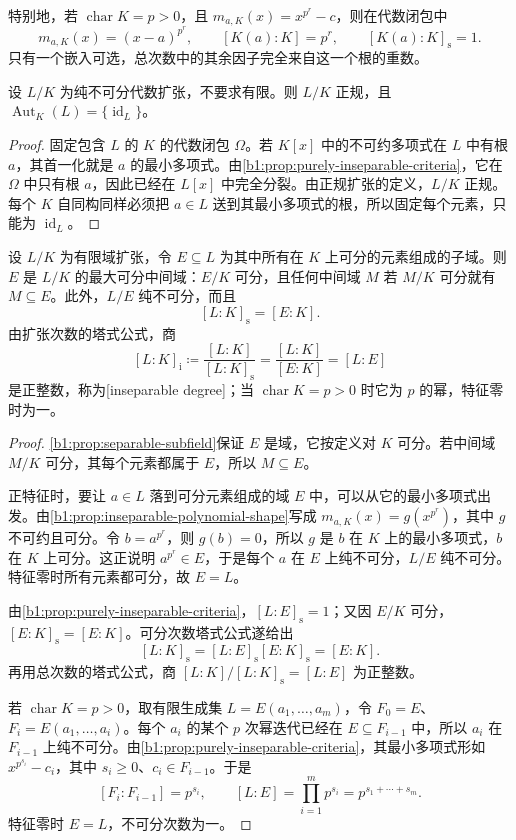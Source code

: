特别地，若 \(\operatorname{char}K=p>0\)，且 \(m_{a,K}(x)=x^{p^r}-c\)，则在代数闭包中
\[
	m_{a,K}(x)=(x-a)^{p^r},\qquad [K(a):K]=p^r,\qquad [K(a):K]_{\mathrm s}=1.
\]
只有一个嵌入可选，总次数中的其余因子完全来自这一个根的重数。

\begin{corollary}\label{b1:cor:purely-inseparable-normal}
	设 \(L/K\) 为纯不可分代数扩张，不要求有限。则 \(L/K\) 正规，且 \(\operatorname{Aut}_K(L)=\{\operatorname{id}_L\}\)。
\end{corollary}
\begin{proof}
	固定包含 \(L\) 的 \(K\) 的代数闭包 \(\Omega\)。若 \(K[x]\) 中的不可约多项式在 \(L\) 中有根 \(a\)，其首一化就是 \(a\) 的最小多项式。由\cref{b1:prop:purely-inseparable-criteria}，它在 \(\Omega\) 中只有根 \(a\)，因此已经在 \(L[x]\) 中完全分裂。由正规扩张的定义，\(L/K\) 正规。每个 \(K\) 自同构同样必须把 \(a\in L\) 送到其最小多项式的根，所以固定每个元素，只能为 \(\operatorname{id}_L\)。
\end{proof}

\begin{proposition}\label{b1:prop:separable-inseparable-decomposition}
	设 \(L/K\) 为有限域扩张，令 \(E\subseteq L\) 为其中所有在 \(K\) 上可分的元素组成的子域。则 \(E\) 是 \(L/K\) 的最大可分中间域：\(E/K\) 可分，且任何中间域 \(M\) 若 \(M/K\) 可分就有 \(M\subseteq E\)。此外，\(L/E\) 纯不可分，而且
	\[
		[L:K]_{\mathrm s}=[E:K].
	\]
	由扩张次数的塔式公式，商
	\[
		[L:K]_{\mathrm i}\coloneqq\frac{[L:K]}{[L:K]_{\mathrm s}} =\frac{[L:K]}{[E:K]}=[L:E]
	\]
	是正整数，称为[inseparable degree]；当 \(\operatorname{char}K=p>0\) 时它为 \(p\) 的幂，特征零时为一。
\end{proposition}
\begin{proof}
	\cref{b1:prop:separable-subfield}保证 \(E\) 是域，它按定义对 \(K\) 可分。若中间域 \(M/K\) 可分，其每个元素都属于 \(E\)，所以 \(M\subseteq E\)。

	正特征时，要让 \(a\in L\) 落到可分元素组成的域 \(E\) 中，可以从它的最小多项式出发。由\cref{b1:prop:inseparable-polynomial-shape}写成 \(m_{a,K}(x)=g(x^{p^r})\)，其中 \(g\) 不可约且可分。令 \(b=a^{p^r}\)，则 \(g(b)=0\)，所以 \(g\) 是 \(b\) 在 \(K\) 上的最小多项式，\(b\) 在 \(K\) 上可分。这正说明 \(a^{p^r}\in E\)，于是每个 \(a\) 在 \(E\) 上纯不可分，\(L/E\) 纯不可分。特征零时所有元素都可分，故 \(E=L\)。

	由\cref{b1:prop:purely-inseparable-criteria}，\([L:E]_{\mathrm s}=1\)；又因 \(E/K\) 可分，\([E:K]_{\mathrm s}=[E:K]\)。可分次数塔式公式遂给出
	\[
		[L:K]_{\mathrm s}=[L:E]_{\mathrm s}[E:K]_{\mathrm s}=[E:K].
	\]
	再用总次数的塔式公式，商 \([L:K]/[L:K]_{\mathrm s}=[L:E]\) 为正整数。

	若 \(\operatorname{char}K=p>0\)，取有限生成集 \(L=E(a_1,\ldots,a_m)\)，令 \(F_0=E\)、\(F_i=E(a_1,\ldots,a_i)\)。每个 \(a_i\) 的某个 \(p\) 次幂迭代已经在 \(E\subseteq F_{i-1}\) 中，所以 \(a_i\) 在 \(F_{i-1}\) 上纯不可分。由\cref{b1:prop:purely-inseparable-criteria}，其最小多项式形如 \(x^{p^{s_i}}-c_i\)，其中 \(s_i\geq0\)、\(c_i\in F_{i-1}\)。于是
	\[
		[F_i:F_{i-1}]=p^{s_i},\qquad [L:E]=\prod_{i=1}^m p^{s_i}=p^{s_1+\cdots+s_m}.
	\]
	特征零时 \(E=L\)，不可分次数为一。
\end{proof}

